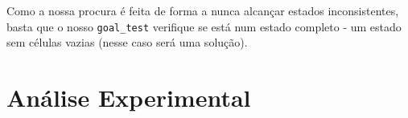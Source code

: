 \documentclass[12pt,a4paper]{article}
\begin{document}
  Como a nossa procura é feita de forma a nunca alcançar estados inconsistentes, basta que o nosso \texttt{goal\_test} verifique se está num estado completo - um estado sem células vazias (nesse caso será uma solução).


  \section*{Análise Experimental}


  
\end{document}
